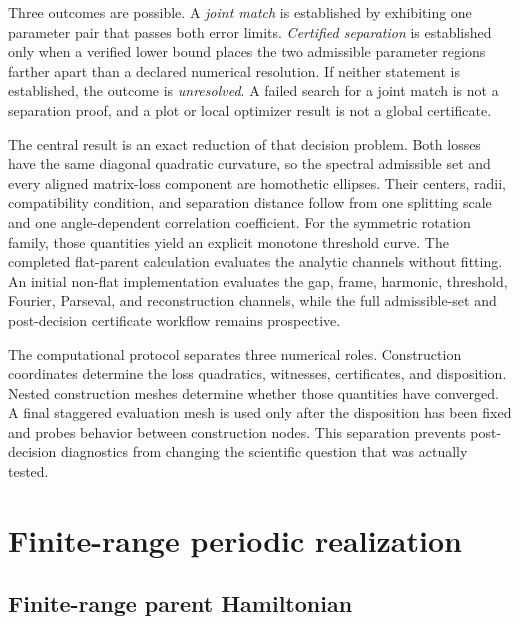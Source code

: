 \documentclass[11pt]{article}
\begin{document}
Three outcomes are possible. A \emph{joint match} is established by exhibiting one
parameter pair that passes both error limits. \emph{Certified separation} is established
only when a verified lower bound places the two admissible parameter regions farther
apart than a declared numerical resolution. If neither statement is established, the
outcome is \emph{unresolved}. A failed search for a joint match is not a separation
proof, and a plot or local optimizer result is not a global certificate.

The central result is an exact reduction of that decision problem. Both losses have the
same diagonal quadratic curvature, so the spectral admissible set and every aligned
matrix-loss component are homothetic ellipses. Their centers, radii, compatibility
condition, and separation distance follow from one splitting scale and one
angle-dependent correlation coefficient. For the symmetric rotation family, those
quantities yield an explicit monotone threshold curve. The completed flat-parent calculation
evaluates the analytic channels without fitting. An initial non-flat implementation
evaluates the gap, frame, harmonic, threshold, Fourier, Parseval, and reconstruction
channels, while the full admissible-set and post-decision certificate workflow remains
prospective.

The computational protocol separates three numerical roles. Construction coordinates determine the
loss quadratics, witnesses, certificates, and disposition. Nested construction meshes
determine whether those quantities have converged. A final staggered evaluation mesh is
used only after the disposition has been fixed and probes behavior between construction
nodes. This separation prevents post-decision diagnostics from changing the scientific
question that was actually tested.

\section{Finite-range periodic realization}

\subsection{Finite-range parent Hamiltonian}
\end{document}
